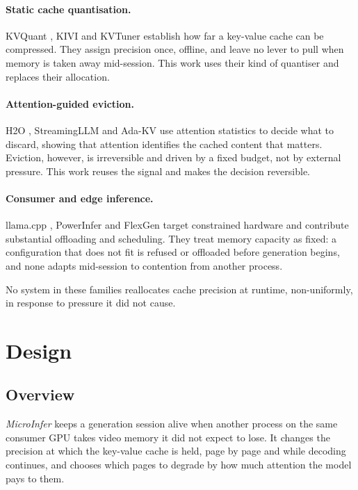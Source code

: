 \documentclass[11pt]{article}
\begin{document}
\paragraph{Static cache quantisation.} KVQuant \cite{hooper2024kvquant}, KIVI
\cite{liu2024kivi} and KVTuner \cite{kvtuner} establish how far a key-value
cache can be compressed. They assign precision once, offline, and leave no lever
to pull when memory is taken away mid-session. This work uses their kind of
quantiser and replaces their allocation.

\paragraph{Attention-guided eviction.} H2O \cite{zhang2023h2o}, StreamingLLM
\cite{xiao2024streamingllm} and Ada-KV \cite{feng2024adakv} use attention
statistics to decide what to discard, showing that attention identifies the
cached content that matters. Eviction, however, is irreversible and driven by a
fixed budget, not by external pressure. This work reuses the signal and makes
the decision reversible.

\paragraph{Consumer and edge inference.} llama.cpp \cite{llamacpp}, PowerInfer
\cite{song2024powerinfer} and FlexGen \cite{sheng2023flexgen} target
constrained hardware and contribute substantial offloading and scheduling. They
treat memory capacity as fixed: a configuration that does not fit is refused or
offloaded before generation begins, and none adapts mid-session to contention
from another process.

No system in these families reallocates cache precision at runtime,
non-uniformly, in response to pressure it did not cause.

\section{Design}
\label{sec:design}

\subsection{Overview}
\label{sec:overview}

\textit{MicroInfer} keeps a generation session alive when another process on the
same consumer GPU takes video memory it did not expect to lose. It changes the
precision at which the key-value cache is held, page by page and while decoding
continues, and chooses which pages to degrade by how much attention the model
pays to them.
\end{document}
